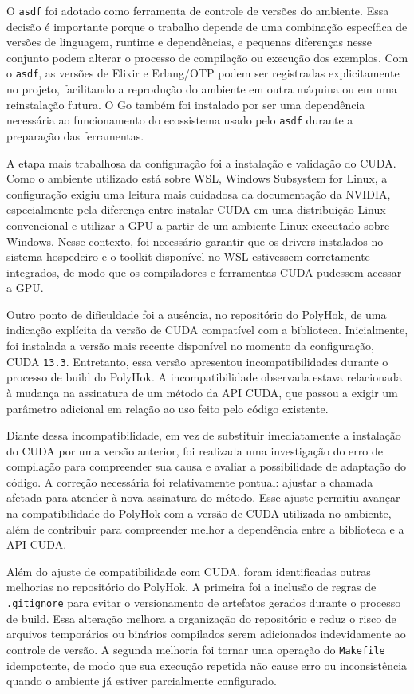 \documentclass[tcc,capa]{texufpel}
\begin{document}
O \texttt{asdf} foi adotado como ferramenta de controle de versões do ambiente. Essa decisão é importante porque o trabalho depende de uma combinação específica de versões de linguagem, runtime e dependências, e pequenas diferenças nesse conjunto podem alterar o processo de compilação ou execução dos exemplos. Com o \texttt{asdf}, as versões de Elixir e Erlang/OTP podem ser registradas explicitamente no projeto, facilitando a reprodução do ambiente em outra máquina ou em uma reinstalação futura. O Go também foi instalado por ser uma dependência necessária ao funcionamento do ecossistema usado pelo \texttt{asdf} durante a preparação das ferramentas.

A etapa mais trabalhosa da configuração foi a instalação e validação do CUDA. Como o ambiente utilizado está sobre WSL, Windows Subsystem for Linux, a configuração exigiu uma leitura mais cuidadosa da documentação da NVIDIA, especialmente pela diferença entre instalar CUDA em uma distribuição Linux convencional e utilizar a GPU a partir de um ambiente Linux executado sobre Windows. Nesse contexto, foi necessário garantir que os drivers instalados no sistema hospedeiro e o toolkit disponível no WSL estivessem corretamente integrados, de modo que os compiladores e ferramentas CUDA pudessem acessar a GPU.

Outro ponto de dificuldade foi a ausência, no repositório do PolyHok, de uma indicação explícita da versão de CUDA compatível com a biblioteca. Inicialmente, foi instalada a versão mais recente disponível no momento da configuração, CUDA \texttt{13.3}. Entretanto, essa versão apresentou incompatibilidades durante o processo de build do PolyHok. A incompatibilidade observada estava relacionada à mudança na assinatura de um método da API CUDA, que passou a exigir um parâmetro adicional em relação ao uso feito pelo código existente.

Diante dessa incompatibilidade, em vez de substituir imediatamente a instalação do CUDA por uma versão anterior, foi realizada uma investigação do erro de compilação para compreender sua causa e avaliar a possibilidade de adaptação do código. A correção necessária foi relativamente pontual: ajustar a chamada afetada para atender à nova assinatura do método. Esse ajuste permitiu avançar na compatibilidade do PolyHok com a versão de CUDA utilizada no ambiente, além de contribuir para compreender melhor a dependência entre a biblioteca e a API CUDA.

Além do ajuste de compatibilidade com CUDA, foram identificadas outras melhorias no repositório do PolyHok. A primeira foi a inclusão de regras de \texttt{.gitignore} para evitar o versionamento de artefatos gerados durante o processo de build. Essa alteração melhora a organização do repositório e reduz o risco de arquivos temporários ou binários compilados serem adicionados indevidamente ao controle de versão. A segunda melhoria foi tornar uma operação do \texttt{Makefile} idempotente, de modo que sua execução repetida não cause erro ou inconsistência quando o ambiente já estiver parcialmente configurado.
\end{document}
